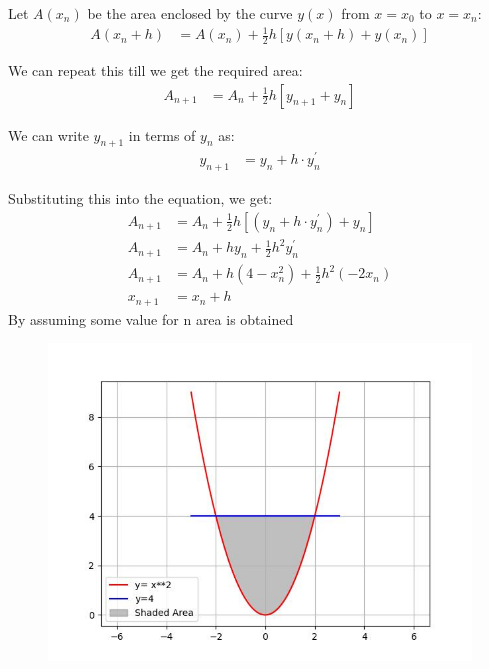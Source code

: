 \documentclass[journal]{IEEEtran}
\begin{document}
Let $A(x_n)$ be the area enclosed by the curve $y(x)$ from $x=x_0$ to $x=x_n$:
\begin{align}
    A(x_{n}+h) &= A(x_n) + \frac{1}{2}h\left[y(x_{n}+h)+y(x_n)\right]
\end{align}

We can repeat this till we get the required area:
\begin{align}
    A_{n+1} &= A_n + \frac{1}{2}h\left[y_{n+1}+y_n\right]
\end{align}

We can write $y_{n+1}$ in terms of $y_n$ as:
\begin{align}
    y_{n+1} &= y_n + h\cdot y^{\prime}_n
\end{align}

Substituting this into the equation, we get:
\begin{align}
    A_{n+1} &= A_n +\frac{1}{2}h\left[\left(y_n+h\cdot y^{\prime}_n\right)+y_n\right] \\
    A_{n+1} &= A_n + hy_n + \frac{1}{2}h^2y^{\prime}_n \\
    A_{n+1} &= A_n + h(4 - x_n^2) + \frac{1}{2}h^2(-2x_n) \\
    x_{n+1} &= x_n + h
\end{align}
By assuming some value for n area is obtained

\begin{figure}[h!]
   \centering
   \includegraphics[width=\columnwidth]{fig/fig.jpg}
\end{figure}
\end{document}
